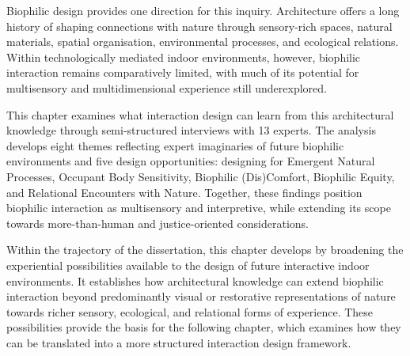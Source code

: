 \begin{synopsis}

Biophilic design provides one direction for this inquiry. Architecture offers a long history of shaping connections with nature through sensory-rich spaces, natural materials, spatial organisation, environmental processes, and ecological relations. Within technologically mediated indoor environments, however, biophilic interaction remains comparatively limited, with much of its potential for multisensory and multidimensional experience still underexplored.

This chapter examines what interaction design can learn from this architectural knowledge through semi-structured interviews with 13 experts. The analysis develops eight themes reflecting expert imaginaries of future biophilic environments and five design opportunities: designing for Emergent Natural Processes, Occupant Body Sensitivity, Biophilic (Dis)Comfort, Biophilic Equity, and Relational Encounters with Nature. Together, these findings position biophilic interaction as multisensory and interpretive, while extending its scope towards more-than-human and justice-oriented considerations.

Within the trajectory of the dissertation, this chapter develops  by broadening the experiential possibilities available to the design of future interactive indoor environments. It establishes how architectural knowledge can extend biophilic interaction beyond predominantly visual or restorative representations of nature towards richer sensory, ecological, and relational forms of experience. These possibilities provide the basis for the following chapter, which examines how they can be translated into a more structured interaction design framework.
\end{synopsis}



